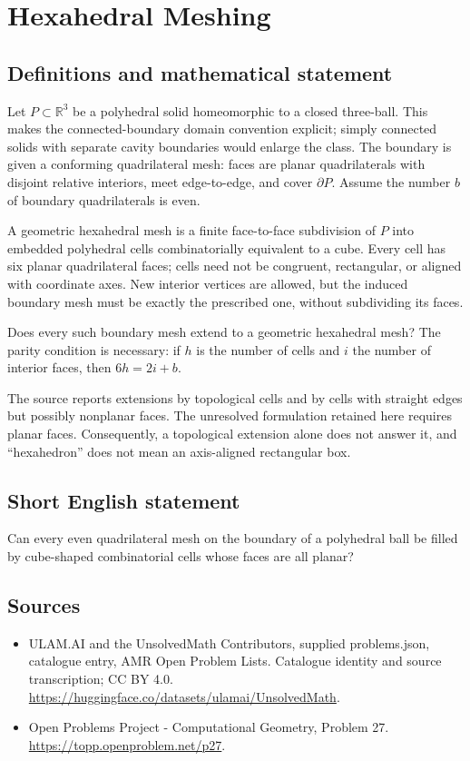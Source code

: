 \documentclass[11pt,a4paper]{article}
\begin{document}
\section*{Hexahedral Meshing}\label{statement}

\subsection{Definitions and mathematical statement}
Let $P\subset\mathbb R^3$ be a polyhedral solid homeomorphic to a closed
three-ball. This makes the connected-boundary domain convention explicit;
simply connected solids with separate cavity boundaries would enlarge
the class. The boundary is given a conforming quadrilateral mesh: faces
are planar quadrilaterals with disjoint relative interiors, meet
edge-to-edge, and cover $\partial P$. Assume the number $b$ of boundary
quadrilaterals is even.

A geometric hexahedral mesh is a finite face-to-face subdivision of
$P$ into embedded polyhedral cells combinatorially equivalent to a
cube. Every cell has six planar quadrilateral faces; cells need not
be congruent, rectangular, or aligned with coordinate axes. New
interior vertices are allowed, but the induced boundary mesh must be
exactly the prescribed one, without subdividing its faces.

Does every such boundary mesh extend to a geometric hexahedral mesh?
The parity condition is necessary: if $h$ is the number of cells and
$i$ the number of interior faces, then $6h=2i+b$.

The source reports extensions by topological cells and by cells with
straight edges but possibly nonplanar faces. The unresolved formulation
retained here requires planar faces. Consequently, a topological
extension alone does not answer it, and ``hexahedron'' does not mean
an axis-aligned rectangular box.
\subsection{Short English statement}
Can every even quadrilateral mesh on the boundary of a polyhedral ball
be filled by cube-shaped combinatorial cells whose faces are all planar?
\subsection{Sources}
\begin{itemize}
\item[S1] ULAM.AI and the UnsolvedMath Contributors, supplied problems.json, catalogue entry, AMR Open Problem Lists. Catalogue identity and source transcription; CC BY 4.0.
\url{https://huggingface.co/datasets/ulamai/UnsolvedMath}.
\item[S2] Open Problems Project - Computational Geometry, Problem 27. 
\url{https://topp.openproblem.net/p27}.
\end{itemize}
\end{document}
